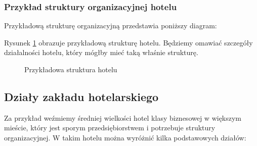 \documentclass[a4paper,onecolumn,oneside,11pt,wide,floatssmall]{mwrep}
\theoremstyle{definition}
\theoremstyle{plain}%
\theoremstyle{remark}
\begin{document}
\subsubsection{Przykład struktury organizacyjnej hotelu}
Przykładową strukturę organizacyjną przedstawia poniższy diagram:

Rysunek \ref{fig:struktura-hotelu} obrazuje przykładową strukturę hotelu. Będziemy omawiać szczegóły działalności hotelu, który mógłby mieć taką właśnie strukturę.

\begin{figure}[H]
  \begin{center}
  \end{center}
  \caption{Przykładowa struktura hotelu}
  \label{fig:struktura-hotelu}
\end{figure}

\subsection{Działy zakładu hotelarskiego}
Za przykład weźmiemy średniej wielkości hotel klasy biznesowej w większym 
mieście, który jest sporym przedsiębiorstwem i potrzebuje struktury 
organizacyjnej. W takim hotelu można wyróżnić kilka podstawowych działów:
\end{document}

